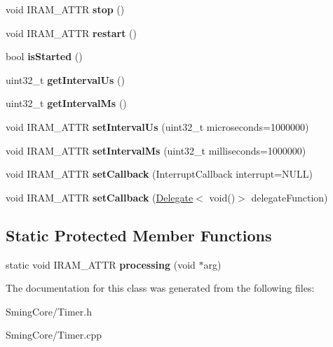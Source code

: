 \begin{DoxyCompactItemize}
\item 
\hypertarget{class_timer_a63f0eb44b27402196590a03781515dba}{}void I\+R\+A\+M\+\_\+\+A\+T\+T\+R {\bfseries stop} ()\label{class_timer_a63f0eb44b27402196590a03781515dba}

\item 
\hypertarget{class_timer_aa3f7871196bb56202af2bc982bfbfff6}{}void I\+R\+A\+M\+\_\+\+A\+T\+T\+R {\bfseries restart} ()\label{class_timer_aa3f7871196bb56202af2bc982bfbfff6}

\item 
\hypertarget{class_timer_a2c03be883cf950d14e058b4205f1526e}{}bool {\bfseries is\+Started} ()\label{class_timer_a2c03be883cf950d14e058b4205f1526e}

\item 
\hypertarget{class_timer_a380785517a76492ac7f4e7362bf24344}{}uint32\+\_\+t {\bfseries get\+Interval\+Us} ()\label{class_timer_a380785517a76492ac7f4e7362bf24344}

\item 
\hypertarget{class_timer_a1b45020e1a67f3242a9a221c262d5968}{}uint32\+\_\+t {\bfseries get\+Interval\+Ms} ()\label{class_timer_a1b45020e1a67f3242a9a221c262d5968}

\item 
\hypertarget{class_timer_a8741950d365027900f1aca0b5dc1520b}{}void I\+R\+A\+M\+\_\+\+A\+T\+T\+R {\bfseries set\+Interval\+Us} (uint32\+\_\+t microseconds=1000000)\label{class_timer_a8741950d365027900f1aca0b5dc1520b}

\item 
\hypertarget{class_timer_ac45d23413ebf02814a710c6ad34ce6ff}{}void I\+R\+A\+M\+\_\+\+A\+T\+T\+R {\bfseries set\+Interval\+Ms} (uint32\+\_\+t milliseconds=1000000)\label{class_timer_ac45d23413ebf02814a710c6ad34ce6ff}

\item 
\hypertarget{class_timer_ab1314cee5c9e9c8a2ad4907522c61778}{}void I\+R\+A\+M\+\_\+\+A\+T\+T\+R {\bfseries set\+Callback} (Interrupt\+Callback interrupt=N\+U\+L\+L)\label{class_timer_ab1314cee5c9e9c8a2ad4907522c61778}

\item 
\hypertarget{class_timer_a2f6797cc319ac535d90611a7c4174ecd}{}void I\+R\+A\+M\+\_\+\+A\+T\+T\+R {\bfseries set\+Callback} (\hyperlink{class_delegate}{Delegate}$<$ void()$>$ delegate\+Function)\label{class_timer_a2f6797cc319ac535d90611a7c4174ecd}

\end{DoxyCompactItemize}
\subsection*{Static Protected Member Functions}
\begin{DoxyCompactItemize}
\item 
\hypertarget{class_timer_a491191cc68599113a50a1ef666f4982c}{}static void I\+R\+A\+M\+\_\+\+A\+T\+T\+R {\bfseries processing} (void $\ast$arg)\label{class_timer_a491191cc68599113a50a1ef666f4982c}

\end{DoxyCompactItemize}


The documentation for this class was generated from the following files\+:\begin{DoxyCompactItemize}
\item 
Sming\+Core/Timer.\+h\item 
Sming\+Core/Timer.\+cpp\end{DoxyCompactItemize}
